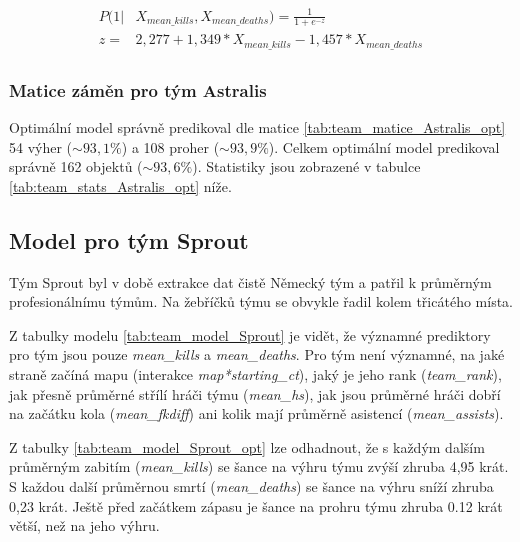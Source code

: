 \begin{align*}
    \begin{split}
        P(1 | &X_{mean\_kills},  X_{mean\_deaths}) = \frac{1}{1 + e^{-z}} \\
        z = &2,277 + 1,349*X_{mean\_kills} - 1,457*X_{mean\_deaths}
    \end{split}
\end{align*}

\subsubsection{Matice záměn pro tým Astralis}



Optimální model správně predikoval dle matice \ref{tab:team_matice_Astralis_opt} 54 výher ($\sim 93,1 \%$) a 108 proher ($\sim 93,9 \%$). Celkem optimální
model predikoval správně 162 objektů ($\sim 93,6 \%$). Statistiky jsou zobrazené v tabulce \ref{tab:team_stats_Astralis_opt} níže.



\subsection{Model pro tým Sprout}
Tým Sprout byl v době extrakce dat čistě Německý tým a patřil k průměrným profesionálnímu týmům. Na žebříčků týmu se obvykle řadil kolem třicátého místa.



Z tabulky modelu \ref{tab:team_model_Sprout} je vidět, že významné prediktory pro tým jsou pouze \textit{mean\_kills} a \textit{mean\_deaths}. Pro tým není významné,
na jaké straně začíná mapu (interakce \textit{map*starting\_ct}), jaký je jeho rank (\textit{team\_rank}), jak přesně průměrné střílí hráči týmu (\textit{mean\_hs}),
jak jsou průměrné hráči dobří na začátku kola (\textit{mean\_fkdiff}) ani kolik mají průměrně asistencí (\textit{mean\_assists}).



Z tabulky \ref{tab:team_model_Sprout_opt} lze odhadnout, že s každým dalším průměrným zabitím (\textit{mean\_kills}) se šance na výhru týmu zvýší zhruba 4,95 krát.
S každou další průměrnou smrtí (\textit{mean\_deaths}) se šance na výhru sníží zhruba 0,23 krát. Ještě před začátkem zápasu je šance na prohru týmu
zhruba 0.12 krát větší, než na jeho výhru.


